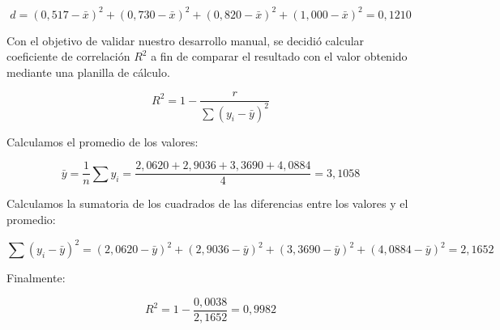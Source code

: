\begin{equation}
    d =
    (0{,}517 - \bar{x})^2 +
    (0{,}730 - \bar{x})^2 +
    (0{,}820 - \bar{x})^2 +
    (1{,}000 - \bar{x})^2
    = 0{,}1210
    \label{eq:dispersion-cuadrados-minimos-r}
\end{equation}


\clearpage

Con el objetivo de validar nuestro desarrollo manual, se decidió calcular coeficiente de correlación $R^2$ a fin de comparar el resultado con el valor obtenido mediante una planilla de cálculo.

\begin{equation}
    R^2 = 1 - \frac{r}{\sum (y_i - \bar{y})^2}
    \label{eq:error-cuadrados-minimos-formula-R2}
\end{equation}

Calculamos el promedio de los valores:

\begin{equation}
    \bar{y} = \frac{1}{n} \sum y_i = \frac{2{,}0620 + 2{,}9036 + 3{,}3690 + 4{,}0884}{4} = 3{,}1058
    \label{eq:error-cuadrados-minimos-promedio-para-R2}
\end{equation}

Calculamos la sumatoria de los cuadrados de las diferencias entre los valores y el promedio:

\begin{equation}
    \sum (y_i - \bar{y})^2 =
    (2{,}0620 - \bar{y})^2 +
    (2{,}9036 - \bar{y})^2 +
    (3{,}3690 - \bar{y})^2 +
    (4{,}0884 - \bar{y})^2
    = 2{,}1652
    \label{eq:error-cuadrados-minimos-divisor-para-R2}
\end{equation}

Finalmente:

\begin{equation}
    R^2 = 1 - \frac{0{,}0038}{2{,}1652} = 0{,}9982
    \label{eq:error-cuadrados-minimos-formula-R2-resolucion}
\end{equation}


\clearpage
